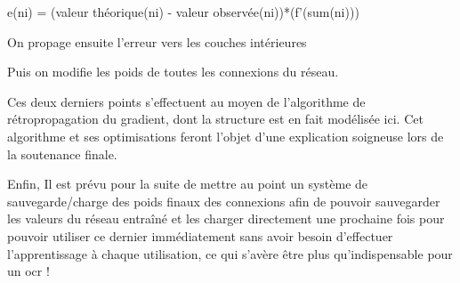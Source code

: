 \documentclass[a4paper,10pt]{report}
\begin{document}
e(ni) = (valeur théorique(ni) - valeur observée(ni))*(f'(sum(ni)))

On propage ensuite l'erreur vers les couches intérieures 

Puis on modifie les poids de toutes les connexions du réseau.

Ces deux derniers points s'effectuent au moyen de l'algorithme de
r\'etropropagation du gradient, dont la structure est en fait
mod\'elis\'ee ici. Cet algorithme et ses optimisations feront l'objet
d'une explication soigneuse lors de la soutenance finale.


Enfin, Il est pr\'evu pour la suite de mettre au point un syst\`eme de
sauvegarde/charge des poids finaux des connexions afin de pouvoir
sauvegarder les valeurs du r\'eseau entra\^iné et les charger
directement une prochaine fois pour pouvoir utiliser ce dernier
imm\'ediatement sans avoir besoin d'effectuer l'apprentissage \`a chaque
utilisation, ce qui s'av\`ere \^etre plus qu'indispensable pour un ocr !




\end{document}
